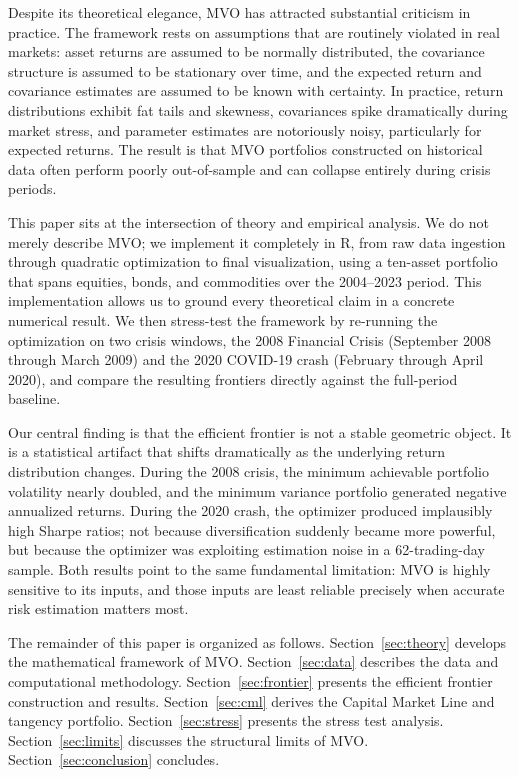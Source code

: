 \documentclass[12pt]{article}
\begin{document}
Despite its theoretical elegance, MVO has attracted substantial criticism in
practice. The framework rests on assumptions that are routinely violated in
real markets: asset returns are assumed to be normally distributed, the
covariance structure is assumed to be stationary over time, and the expected
return and covariance estimates are assumed to be known with certainty. In
practice, return distributions exhibit fat tails and skewness, covariances
spike dramatically during market stress, and parameter estimates are notoriously
noisy, particularly for expected returns. The result is that MVO portfolios
constructed on historical data often perform poorly out-of-sample and can
collapse entirely during crisis periods.

This paper sits at the intersection of theory and empirical analysis. We do
not merely describe MVO; we implement it completely in R, from raw data
ingestion through quadratic optimization to final visualization, using a
ten-asset portfolio that spans equities, bonds, and commodities over the
2004--2023 period. This implementation allows us to ground every theoretical
claim in a concrete numerical result. We then stress-test the framework by
re-running the optimization on two crisis windows, the 2008 Financial Crisis
(September 2008 through March 2009) and the 2020 COVID-19 crash (February
through April 2020), and compare the resulting frontiers directly against
the full-period baseline.

Our central finding is that the efficient frontier is not a stable geometric
object. It is a statistical artifact that shifts dramatically as the underlying
return distribution changes. During the 2008 crisis, the minimum achievable
portfolio volatility nearly doubled, and the minimum variance portfolio
generated negative annualized returns. During the 2020 crash, the optimizer
produced implausibly high Sharpe ratios; not because diversification suddenly
became more powerful, but because the optimizer was exploiting estimation noise
in a 62-trading-day sample. Both results point to the same fundamental
limitation: MVO is highly sensitive to its inputs, and those inputs are least
reliable precisely when accurate risk estimation matters most.

The remainder of this paper is organized as follows. Section~\ref{sec:theory}
develops the mathematical framework of MVO. Section~\ref{sec:data} describes
the data and computational methodology. Section~\ref{sec:frontier} presents
the efficient frontier construction and results. Section~\ref{sec:cml} derives
the Capital Market Line and tangency portfolio. Section~\ref{sec:stress}
presents the stress test analysis. Section~\ref{sec:limits} discusses the
structural limits of MVO. Section~\ref{sec:conclusion} concludes.
\end{document}
